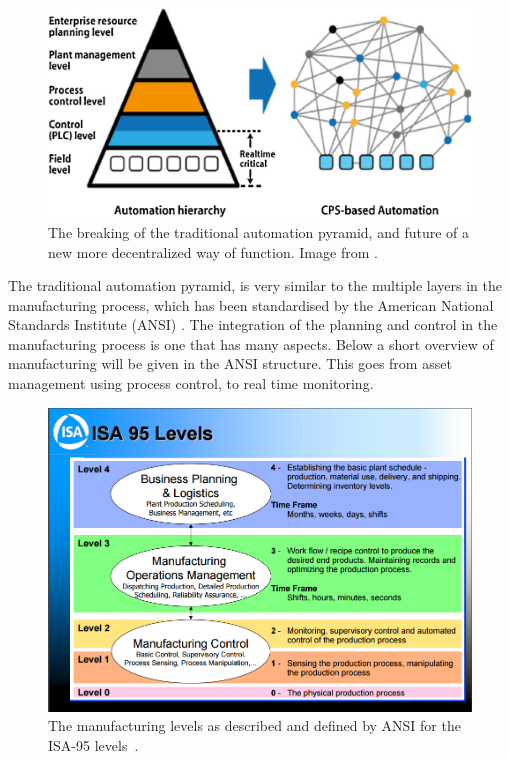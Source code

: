 \begin{figure}
\centering
\includegraphics[width=0.9\linewidth]{"img/traditional automation pyramid1"}
\caption{The breaking of the traditional automation pyramid, and future of a new more decentralized way of function. Image from \citet{monostori2016cyber}.}
\label{fig:traditional-automation-pyramid1}
\end{figure}

	The traditional automation pyramid, is very similar to the multiple layers in the manufacturing process, which has been standardised by the American National Standards Institute (ANSI) \citep{harjunkoski2009integration}. The integration of the planning and control in the manufacturing process is one that has many aspects. Below a short overview of manufacturing will be given in the ANSI structure. This goes from asset management using process control, to real time monitoring. 
	
	
	
	\begin{figure}
\centering
\includegraphics[width=1\linewidth]{img/ansi-isa-95}
\caption{The manufacturing levels as described and defined by ANSI for the ISA-95 levels~\citep{brandl2008ISA}. }
\label{fig:ansi-isa-95}
\end{figure}

